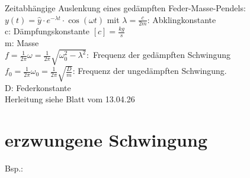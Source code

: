 \documentclass{article}
\begin{document}
	Zeitabhängige Auslenkung eines gedämpften Feder-Masse-Pendels: $y (t) = \hat{y} \cdot e^{- \lambda t} \cdot \cos (\omega t)$ mit $\lambda = \frac{c}{2m}$: Abklingkonstante\\
	c: Dämpfungskonstante $[c] = \frac{kg}{s}$\\
	m: Masse\\
	$f = \frac{1}{2\pi} \omega = \frac{1}{2 \pi} \sqrt{\omega_0^2 - \lambda^2}:$ Frequenz der gedämpften Schwingung\\
	$f_0 =  \frac{1}{2 \pi} \omega_0 = \frac{1}{2 \pi} \sqrt{\frac{D}{m}}$: Frequenz der ungedämpften Schwingung.\\
	D: Federkonstante\\
	Herleitung siehe Blatt vom 13.04.26\\

	\newpage
	\section{erzwungene Schwingung}
	Bsp.:\\
\end{document}
